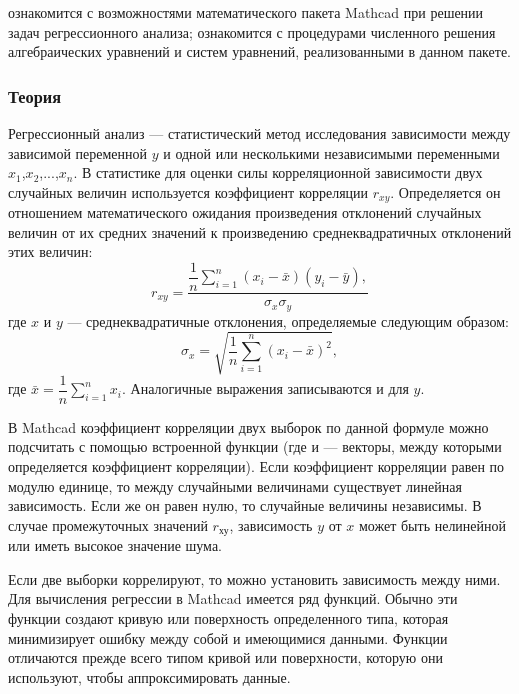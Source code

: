 
\goal ознакомится с возможностями математического пакета Mathcad при решении задач регрессионного анализа; ознакомится с процедурами численного решения алгебраических уравнений и систем уравнений, реализованными в данном пакете. 

\subsubsection*{Теория}
Регрессионный анализ --- статистический метод исследования зависимости между зависимой переменной $y$ и одной или несколькими независимыми переменными $x_1$,$x_2$,...,$x_n$.
В статистике для оценки силы корреляционной зависимости двух случайных величин используется коэффициент корреляции $r_{xy}$. Определяется он отношением математического ожидания произведения отклонений случайных величин от их средних значений к произведению среднеквадратичных отклонений этих величин:
\begin{equation}
r_{xy}=\dfrac{\dfrac{1}{n} \sum\limits_{i=1}^{n} (x_i-\bar{x}) (y_i-\bar{y}), }{\sigma_x \sigma_y}
\end{equation}
где $x$ и $y$ --- среднеквадратичные отклонения, определяемые следующим образом:
\begin{equation}
\sigma_x=\sqrt{\dfrac{1}{n} \sum\limits_{i=1}^{n}(x_i-\bar{x})^2},
\end{equation}
где $\bar{x}=\dfrac{1}{n} \sum\limits_{i=1}^{n} x_i$.
Аналогичные выражения записываются и для $y$.

В Mathcad коэффициент корреляции двух выборок по данной формуле можно подсчитать с помощью встроенной функции  (где  и  --- векторы, между которыми определяется коэффициент корреляции). Если коэффициент корреляции равен по модулю единице, то между случайными величинами существует линейная зависимость. Если же он равен нулю, то случайные величины независимы. В случае промежуточных значений $r_{ху}$, зависимость $y$ от $x$ может быть нелинейной или иметь высокое значение шума.

Если две выборки коррелируют, то можно установить зависимость между ними. Для вычисления регрессии в Mathcad имеется ряд функций. Обычно эти функции создают кривую или поверхность определенного типа, которая минимизирует ошибку между собой и имеющимися данными. Функции отличаются прежде всего типом кривой или поверхности, которую они используют, чтобы аппроксимировать данные.

